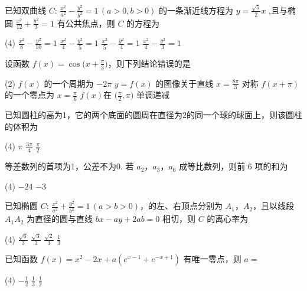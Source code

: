 \begin{question}
已知双曲线 $C\colon\,\frac{x^2}{a^2}-\frac{y^2}{b^2}=1\,(a>0,b>0)$ 的一条渐近线方程为 $y=\frac{\sqrt{5}}{2}x$ ,且与椭圆
	$\frac{x^2}{12}+\frac{y^2}{3}=1$ 有公共焦点，则 $C$ 的方程为
	\begin{tasks}(4)
		\task $\frac{x^2}{8}-\frac{y^2}{10}=1$ \task $\frac{x^2}{4}-\frac{y^2}{5}=1$ \task $\frac{x^2}{5}-\frac{y^2}{4}=1$ \task $\frac{x^2}{4}-\frac{y^2}{3}=1$
	\end{tasks}
\end{question}

\begin{question}
设函数 $f(x)=\cos\Big(x+\frac{\pi}{3}\Big)$，则下列结论错误的是
	\begin{tasks}(2)
		\task $f(x)$ 的一个周期为 $-2\pi$ \task $y=f(x)$ 的图像关于直线 $x=\frac{8\pi}{3}$ 对称
		\task $f(x+\pi)$ 的一个零点为 $x=\frac{\pi}{6}$ \task  $f(x)$在 $\Big(\frac{\pi}{2},\pi\Big)$ 单调递减
	\end{tasks}
\end{question}

	
\begin{question}
已知圆柱的高为1，它的两个底面的圆周在直径为2的同一个球的球面上，则该圆柱的体积为
	\begin{tasks}(4)
		\task $\pi$ \task $\frac{3\pi}{4}$ \task $\frac{\pi}{2}$ 
	\end{tasks}
\end{question}


\begin{question}
等差数列的首项为1，公差不为0. 若 $a_2$，$a_3$，$a_6$ 成等比数列，则前 6 项的和为
	\begin{tasks}(4)
		\task $-24$ \task $-3$  
	\end{tasks}
\end{question}

\begin{question}
已知椭圆 $C\colon\,\frac{x^2}{a^2}+\frac{y^2}{b^2}=1\,(a>b>0)$，的左、右顶点分别为 $A_1$，$A_2$，且以线段 $A_1A_2$ 为直径的圆与直线 $bx-ay+2ab=0$ 相切，则 $C$ 的离心率为
	\begin{tasks}(4)
		\task $\frac{\sqrt{6}}{3}$ \task $\frac{\sqrt{3}}{3}$ \task $\frac{\sqrt{2}}{3}$ \task $\frac{1}{3}$
	\end{tasks}
\end{question}


\begin{question}已知函数 $f(x)=x^2-2x+a(e^{x-1}+e^{-x+1})$ 有唯一零点，则 $a=$
	\begin{tasks}(4)
		\task $-\frac{1}{2}$ \task $\frac{1}{3}$ \task $\frac{1}{2}$ 
	\end{tasks}
\end{question}



